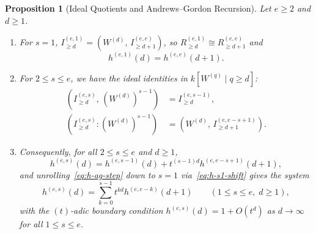 \documentclass[a4paper, 12pt]{amsart}
\newtheorem{proposition}[theorem]{Proposition}
\theoremstyle{remark}
\begin{document}
\begin{proposition}[Ideal Quotients and Andrews--Gordon Recursion]
\label{prop:finite-var-ag-recursion}
Let $e \ge 2$ and $d \ge 1$.
\begin{enumerate}
  \item For $s = 1$,
  $I_{\ge d}^{(e, 1)} = \left(W^{(d)}, \, I_{\ge d + 1}^{(e, e)}\right)$,
  so $R_{\ge d}^{(e, 1)} \cong R_{\ge d + 1}^{(e, e)}$ and
  \begin{equation}
    \label{eq:h-s1-shift}
    h^{(e, 1)}(d) = h^{(e, e)}(d + 1).
  \end{equation}
  \item For $2 \le s \le e$,
  we have the ideal identities in $k[W^{(q)} \mid q \ge d]$:
  \begin{align}
    \left(I_{\ge d}^{(e, s)}, \, (W^{(d)})^{s - 1}\right) &= I_{\ge d}^{(e, s - 1)}, \label{eq:ideal-sum-s} \\
    \left(I_{\ge d}^{(e, s)} : (W^{(d)})^{s - 1}\right) &= \left(W^{(d)}, \, I_{\ge d + 1}^{(e, e - s + 1)}\right). \label{eq:ideal-colon-s}
  \end{align}
  \item Consequently,
  for all $2 \le s \le e$ and $d \ge 1$,
  \begin{equation}
    \label{eq:h-ag-step}
    h^{(e, s)}(d) = h^{(e, s - 1)}(d) + t^{(s - 1)d} h^{(e, e - s + 1)}(d + 1),
  \end{equation}
  and unrolling~\eqref{eq:h-ag-step} down to $s = 1$ via~\eqref{eq:h-s1-shift} gives the system
  \begin{equation}
    \label{eq:h-ag-unrolled}
    h^{(e, s)}(d) = \sum_{k = 0}^{s - 1} t^{k d} h^{(e, e - k)}(d + 1) \qquad (1 \le s \le e, \; d \ge 1),
  \end{equation}
  with the $(t)$-adic boundary condition $h^{(e, s)}(d) = 1 + O(t^d)$ as $d \to \infty$ for all $1 \le s \le e$.
\end{enumerate}
\end{proposition}
\end{document}
